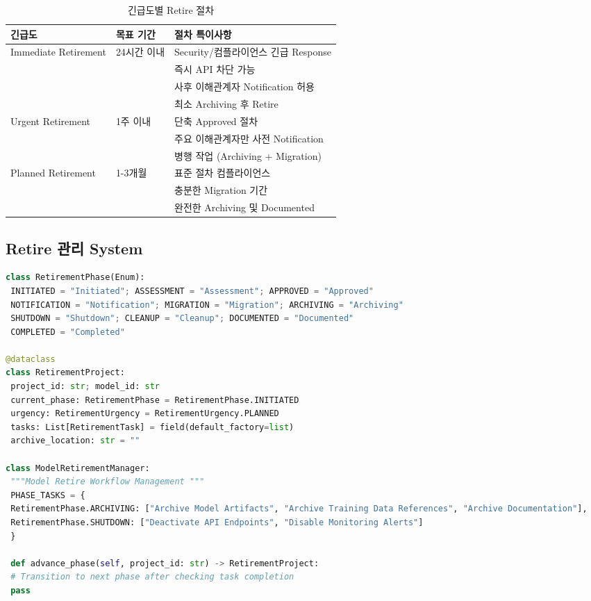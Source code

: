 \begin{table}[htbp]
\centering
\caption{긴급도별 Retire 절차}
\label{tab:urgency_procedures}
\begin{tabularx}{\textwidth}{p{2cm}p{2cm}X}
\toprule
\textbf{긴급도} & \textbf{목표 기간} & \textbf{절차 특이사항} \\
\midrule
Immediate Retirement &
24시간 이내 &
 Security/컴플라이언스 긴급 Response\\
& & 즉시 API 차단 가능\\
& & 사후 이해관계자 Notification 허용\\
& & 최소 Archiving 후 Retire \\
\midrule
Urgent Retirement &
1주 이내 &
 단축 Approved 절차\\
& & 주요 이해관계자만 사전 Notification\\
& & 병행 작업 (Archiving + Migration)\\
\midrule
Planned Retirement &
1-3개월 &
 표준 절차 컴플라이언스\\
& & 충분한 Migration 기간\\
& & 완전한 Archiving 및 Documented \\
\bottomrule
\end{tabularx}
\end{table}


\subsection{Retire 관리 System}
\label{sec:12.2.3}

\begin{lstlisting}[language=Python, caption={Model Retirement Management System Implementation}, label={lst:retirement_management}]
class RetirementPhase(Enum):
 INITIATED = "Initiated"; ASSESSMENT = "Assessment"; APPROVED = "Approved"
 NOTIFICATION = "Notification"; MIGRATION = "Migration"; ARCHIVING = "Archiving"
 SHUTDOWN = "Shutdown"; CLEANUP = "Cleanup"; DOCUMENTED = "Documented"
 COMPLETED = "Completed"

@dataclass
class RetirementProject:
 project_id: str; model_id: str
 current_phase: RetirementPhase = RetirementPhase.INITIATED
 urgency: RetirementUrgency = RetirementUrgency.PLANNED
 tasks: List[RetirementTask] = field(default_factory=list)
 archive_location: str = ""

class ModelRetirementManager:
 """Model Retire Workflow Management """
 PHASE_TASKS = {
 RetirementPhase.ARCHIVING: ["Archive Model Artifacts", "Archive Training Data References", "Archive Documentation"],
 RetirementPhase.SHUTDOWN: ["Deactivate API Endpoints", "Disable Monitoring Alerts"]
 }

 def advance_phase(self, project_id: str) -> RetirementProject:
 # Transition to next phase after checking task completion
 pass
\end{lstlisting}


